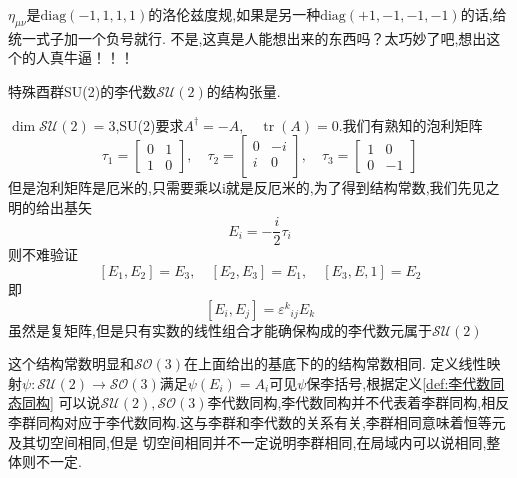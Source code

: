 \documentclass[../main.tex]{subfiles}
\begin{document}
  \begin{note}
  $\eta_{\mu\nu}$是$\text{diag}(-1,1,1,1)$的洛伦兹度规,如果是另一种$\text{diag}(+1,-1,-1,-1)$的话,给统一式子加一个负号就行.
  不是,这真是人能想出来的东西吗？太巧妙了吧,想出这个的人真牛逼！！！
  \end{note}
 \begin{example}
   \label{ex:G-6-4}
     特殊酉群SU(2)的李代数$\mathscr{SU}(2)$的结构张量.
 \end{example}
 $\dim\mathscr{SU}(2) = 3$,SU(2)要求$A^\dagger = -A,\quad \operatorname{tr}(A) = 0$.我们有熟知的泡利矩阵
 $$\tau_1 = \begin{bmatrix}
     0&1\\
     1&0
 \end{bmatrix},\quad \tau_2=\begin{bmatrix}
     0&-i\\
     i&0\\
 \end{bmatrix},\quad \tau_3 = \begin{bmatrix}
     1&0\\
     0&-1
 \end{bmatrix}$$但是泡利矩阵是厄米的,只需要乘以i就是反厄米的,为了得到结构常数,我们先见之明的给出基矢
 $$E_i = -\frac{i}{2}\tau_i$$
 则不难验证$$[E_1,E_2] = E_3,\quad [E_2,E_3] = E_1, \quad [E_3,E,1] = E_2$$
 即$$[E_i,E_j] = \varepsilon^k{}_{ij}E_k$$
 虽然是复矩阵,但是只有实数的线性组合才能确保构成的李代数元属于$\mathscr{SU}(2)$

 这个结构常数明显和$\mathscr{SO}(3)$在上面给出的基底下的的结构常数相同.
 定义线性映射$\psi:\mathscr{SU}(2) \rightarrow \mathscr{SO}(3)$满足$\psi(E_i) = A_i$可见$\psi$保李括号,根据定义\ref{def:李代数同态同构}
 可以说$\mathscr{SU}(2),\mathscr{SO}(3)$李代数同构,李代数同构并不代表着李群同构,相反李群同构对应于李代数同构.这与李群和李代数的关系有关,李群相同意味着恒等元及其切空间相同,但是
 切空间相同并不一定说明李群相同,在局域内可以说相同,整体则不一定.
\end{document}
